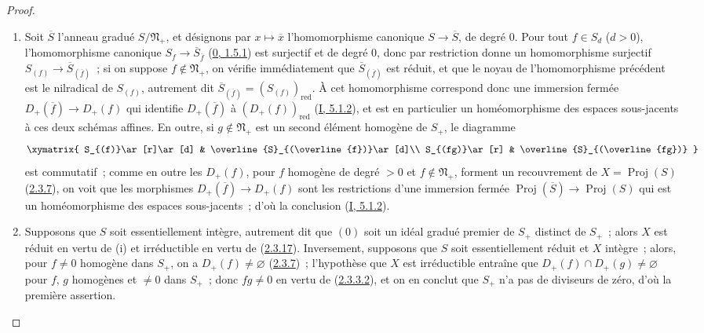 \begin{proof}
\begin{enumerate}
  \item[\rm(i)] Soit $\overline{S}$ l'anneau gradué
    $S/\mathfrak{N}_+$, et désignons par $x\mapsto\overline{x}$
    l'homomorphisme canonique $S\to\overline{S}$, de degré $0$. Pour tout
    $f\in S_d$ ($d>0$), l'homomorphisme canonique
    $S_f\to\overline{S}_{\overline{f}}$
    (\hyperref[0.1.5.1-fr]{0, 1.5.1}) est surjectif et de degré $0$, donc
    par restriction donne un homomorphisme surjectif
    $S_{(f)}\to\overline{S}_{(\overline{f})}$~; si on suppose
    $f\notin\mathfrak{N}_+$, on vérifie immédiatement que
    $\overline{S}_{(\overline{f})}$ est réduit, et que le noyau de
    l'homomorphisme précédent est le nilradical de $S_{(f)}$, autrement dit
    $\overline{S}_{(\overline{f})}=(S_{(f)})_{\mathrm{red}}$. À cet
    homomorphisme correspond donc une immersion fermée
    $D_+(\overline{f})\to D_+(f)$ qui identifie $D_+(\overline{f})$ à
    $(D_+(f))_{\mathrm{red}}$ (\hyperref[I.5.1.2-fr]{I, 5.1.2}), et est en
    particulier un homéomorphisme des espaces sous-jacents à ces deux
    schémas affines. En outre, si $g\notin\mathfrak{N}_+$ est un second
    élément homogène de $S_+$, le diagramme
    \[
      \xymatrix{
        S_{(f)}\ar[r]\ar[d]
        & \overline{S}_{(\overline{f})}\ar[d]\\
        S_{(fg)}\ar[r]
        & \overline{S}_{(\overline{fg})}
      }
    \]
    est commutatif~; comme en outre les $D_+(f)$, pour $f$ homogène de
    degré $>0$ et $f\notin\mathfrak{N}_+$, forment un recouvrement de
    $X=\operatorname{Proj}(S)$ (\hyperref[II.2.3.7-fr]{2.3.7}), on voit
    que les morphismes $D_+(\overline{f})\to D_+(f)$ sont les restrictions
    d'une immersion fermée
    $\operatorname{Proj}(\overline{S})\to\operatorname{Proj}(S)$ qui est
    un homéomorphisme des espaces sous-jacents~; d'où la conclusion
    (\hyperref[I.5.1.2-fr]{I, 5.1.2}).
  \item[\rm(ii)] Supposons que $S$ soit essentiellement intègre, autrement
    dit que $(0)$ soit un idéal gradué premier de $S_+$ distinct de $S_+$~;
    alors $X$ est réduit en vertu de (i) et irréductible en vertu de
    (\hyperref[II.2.3.17-fr]{2.3.17}). Inversement, supposons que $S$ soit
    essentiellement réduit et $X$ intègre~; alors, pour $f\neq0$ homogène
    dans $S_+$, on a $D_+(f)\neq\varnothing$
    (\hyperref[II.2.3.7-fr]{2.3.7})~; l'hypothèse que $X$ est irréductible
    entraîne que $D_+(f)\cap D_+(g)\neq\varnothing$ pour $f$, $g$
    homogènes et $\neq0$ dans $S_+$~; donc $fg\neq0$ en vertu de
    (\hyperref[II.2.3.3.2-fr]{2.3.3.2}), et on en conclut que $S_+$ n'a pas
    de diviseurs de zéro, d'où la première assertion.
\end{enumerate}
\end{proof}

